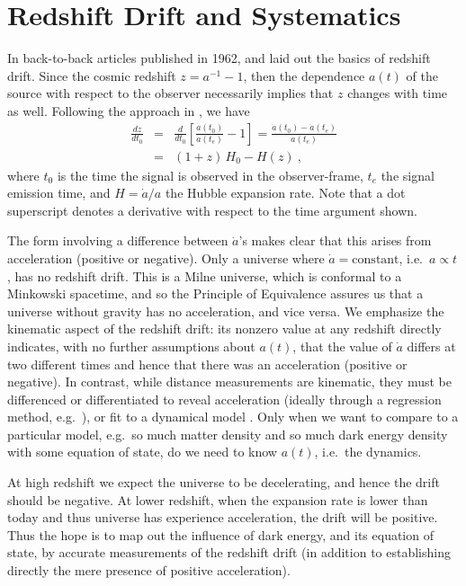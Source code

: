\documentclass[preprint2, 10pt]{aastex}
\newcommand{\bea}{\begin{eqnarray}}
\newcommand{\eea}{\end{eqnarray}}
\begin{document}
\section{Redshift Drift and Systematics} \label{sec:basic} 

In back-to-back articles published in 1962, \citet{mcvittie} and 
\citet{sandage} laid out the basics of redshift drift.  Since the 
cosmic redshift $z=a^{-1}-1$, then the dependence $a(t)$ of the source with 
respect to the observer necessarily implies that $z$ changes with time as 
well. Following the approach in \citet{fpoc}, we have 
\bea 
\frac{dz}{dt_0}&=&\frac{d}{dt_0}\left[\frac{a(t_0)}{a(t_e)}-1\right] 
=\frac{\dot a(t_0)-\dot a (t_e)}{a(t_e)}\\ 
&=&(1+z)\,H_0-H(z)\ , \label{zdot:eqn}
\eea 
where $t_0$ is the time the signal is observed in the observer-frame, 
$t_e$ the signal emission time, and $H=\dot a/a$ the Hubble expansion rate. 
Note that a dot superscript denotes a derivative with respect to the 
time argument shown. 

The form involving a difference 
between $\dot a$'s makes clear that this arises from acceleration (positive 
or negative).
Only a universe where $\dot a=\mbox{constant}$, i.e.\ $a\propto t$, 
has no redshift drift.  This is a Milne universe, which is conformal to a 
Minkowski spacetime, and so the Principle of Equivalence assures us that 
a universe without gravity has no acceleration, and vice versa. 
We emphasize the kinematic aspect of the redshift drift:
its nonzero 
value at any redshift directly indicates,
with no further assumptions about $a(t)$,
that the value of $\dot{a}$ differs at two different times and hence that there was an acceleration
(positive or negative).
In contrast, while distance measurements are kinematic, they must be differenced or 
differentiated to reveal acceleration (ideally through a regression 
method, e.g.\ \citet{2012PhRvD..85l3530S,2012JCAP...06..036S}), or fit to 
a dynamical model \citep{1998AJ....116.1009R,1999ApJ...517..565P}. 
Only when we want to compare 
to a particular model, e.g.\ so much matter density and so much dark energy 
density with some equation of state, do we need to know $a(t)$, i.e.\ the dynamics.


At high redshift we expect the universe to be decelerating, and hence 
the drift should be negative. 
At lower redshift, when the expansion rate is lower than today and thus universe has experience acceleration, the drift will be
positive.
Thus the hope is to map out the 
influence of dark energy, and its equation of state, by accurate 
measurements of the redshift drift (in addition to establishing directly 
the mere presence of positive acceleration). 
\end{document}
